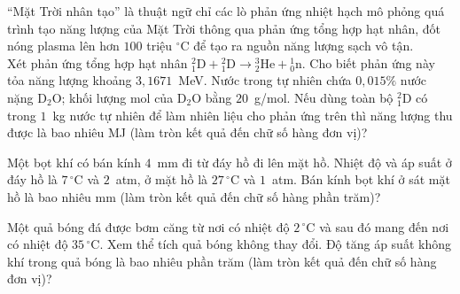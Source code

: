 	\begin{ex}%
		``Mặt Trời nhân tạo'' là thuật ngữ chỉ các lò phản ứng nhiệt hạch mô phỏng quá trình tạo năng lượng của Mặt Trời thông qua phản ứng tổng hợp hạt nhân, đốt nóng plasma lên hơn $100$ triệu $^\circ$C để tạo ra nguồn năng lượng sạch vô tận.\\
		Xét phản ứng tổng hợp hạt nhân ${}^2_1\text{D}+{}^2_1\text{D}\to{}^3_2\text{He}+{}^1_0\text{n}$. Cho biết phản ứng này tỏa năng lượng khoảng $3{,}1671$~MeV. Nước trong tự nhiên chứa $0{,}015\%$ nước nặng D$_2$O; khối lượng mol của D$_2$O bằng $20$~g/mol. Nếu dùng toàn bộ ${}^2_1\text{D}$ có trong $1$~kg nước tự nhiên để làm nhiên liệu cho phản ứng trên thì năng lượng thu được là bao nhiêu MJ (làm tròn kết quả đến chữ số hàng đơn vị)?
		\par
	\end{ex}

	\begin{ex}%
		Một bọt khí có bán kính $4$~mm đi từ đáy hồ đi lên mặt hồ. Nhiệt độ và áp suất ở đáy hồ là $7\,^\circ\text{C}$ và $2$~atm, ở mặt hồ là $27\,^\circ\text{C}$ và $1$~atm. Bán kính bọt khí ở sát mặt hồ là bao nhiêu mm (làm tròn kết quả đến chữ số hàng phần trăm)?
		\par
	\end{ex}

	\begin{ex}%
		Một quả bóng đá được bơm căng từ nơi có nhiệt độ $2\,^\circ\text{C}$ và sau đó mang đến nơi có nhiệt độ $35\,^\circ\text{C}$. Xem thể tích quả bóng không thay đổi. Độ tăng áp suất không khí trong quả bóng là bao nhiêu phần trăm (làm tròn kết quả đến chữ số hàng đơn vị)?
		\par
	\end{ex}

